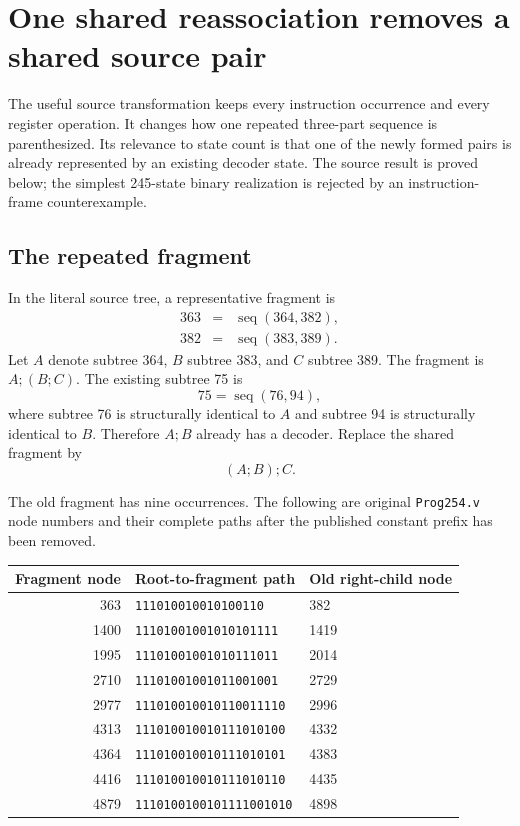 \section{One shared reassociation removes a shared source pair}
\label{sec:rotation-source-proof}

The useful source transformation keeps every instruction occurrence and
every register operation.  It changes how one repeated three-part sequence
is parenthesized.  Its relevance to state count is that one of the newly
formed pairs is already represented by an existing decoder state.  The
source result is proved below; the simplest 245-state binary realization
is rejected by an instruction-frame counterexample.

\subsection{The repeated fragment}

In the literal source tree, a representative fragment is
\[
 \begin{array}{rcl}
 363&=&\operatorname{seq}(364,382),\\
 382&=&\operatorname{seq}(383,389).
 \end{array}
\]
Let $A$ denote subtree 364, $B$ subtree 383, and $C$ subtree 389.  The
fragment is $A;(B;C)$.  The existing subtree 75 is
\[
 75=\operatorname{seq}(76,94),
\]
where subtree 76 is structurally identical to $A$ and subtree 94 is
structurally identical to $B$.  Therefore $A;B$ already has a decoder.
Replace the shared fragment by
\[
 \boxed{\qquad (A;B);C.\qquad}
\]

The old fragment has nine occurrences.  The following are original
\texttt{Prog254.v} node numbers and their complete paths after the
published constant prefix has been removed.
\begin{center}
\small
\begin{tabular}{rll}
Fragment node & Root-to-fragment path & Old right-child node\\
\hline
363  & \texttt{111010010010100110} & 382\\
1400 & \texttt{11101001001010101111} & 1419\\
1995 & \texttt{11101001001010111011} & 2014\\
2710 & \texttt{11101001001011001001} & 2729\\
2977 & \texttt{111010010010110011110} & 2996\\
4313 & \texttt{111010010010111010100} & 4332\\
4364 & \texttt{111010010010111010101} & 4383\\
4416 & \texttt{111010010010111010110} & 4435\\
4879 & \texttt{1110100100101111001010} & 4898
\end{tabular}
\end{center}

